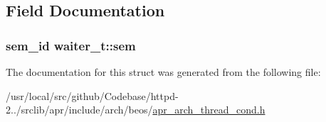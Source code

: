 \subsection{Field Documentation}
\subsubsection[{\texorpdfstring{sem}{sem}}]{\setlength{\rightskip}{0pt plus 5cm}sem\+\_\+id waiter\+\_\+t\+::sem}\hypertarget{structwaiter__t_a08783f5b48e6925251baf38adbaa8175}{}\label{structwaiter__t_a08783f5b48e6925251baf38adbaa8175}


The documentation for this struct was generated from the following file\+:\begin{DoxyCompactItemize}
\item 
/usr/local/src/github/\+Codebase/httpd-\/2../srclib/apr/include/arch/beos/\hyperlink{beos_2apr__arch__thread__cond_8h}{apr\+\_\+arch\+\_\+thread\+\_\+cond.\+h}\end{DoxyCompactItemize}

